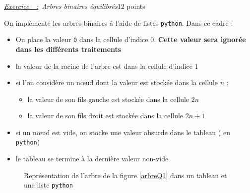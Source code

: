 \documentclass[a4paper, 11pt]{article}
\newcounter{exercice}
\newenvironment{Exercice}[1][]{
    \refstepcounter{exercice}
    \par
    \noindent
    {\large
    \underline{\textit{Exercice~\theexercice~:}}~#1}
    \par}
    {\vspace{1em}}
\newcommand{\python}{\texttt{python}}
\begin{document}
\begin{Exercice}[\textit{Arbres binaires équilibrés}\hfill 12 points]
  On implémente les arbres binaires à l'aide de listes \python. Dans ce cadre :
  \begin{itemize}
    \item On place la valeur \texttt{0} dans la cellule d'indice $0$. \textbf{Cette valeur sera ignorée dans les différents traitements}
    \item la valeur de la racine de l'arbre est dans la cellule d'indice $1$
    \item si l'on considère un nœud dont la valeur est stockée dans la cellule $n$ :
          \begin{itemize}
            \item la valeur de son fils gauche est stockée dans la cellule $2n$
            \item la valeur de son fils droit est stockée dans la cellule $2n+1$
          \end{itemize}
    \item si un nœud est vide, on stocke une valeur absurde dans le tableau ( en \python)
    \item le tableau se termine à la dernière valeur non-vide
  \end{itemize}

  \begin{figure}[!ht]
    \centering
    \footnotesize{
    }
    \caption{Représentation de l'arbre de la figure \ref{arbreQ1} dans un tableau et une liste \python}
  \end{figure}


\end{Exercice}
\end{document}

